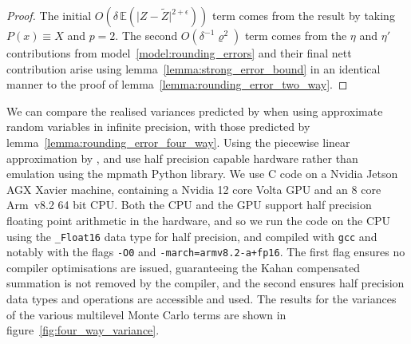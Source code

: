 \documentclass[manuscript,review]{acmart}
\begin{document}
\begin{proof}
The initial $ O(\delta\, \mathbb{E}(\lvert Z - \widetilde{Z} \rvert^{2 + \epsilon})) $ term comes from the result by \citet{giles2020approximate,giles2020approximating} taking $ P(x) \equiv X $ and $ p = 2 $. The second  $ O(\delta^{-1}\varrho^2)  $ term comes from the $ \eta $ and $ \eta' $ contributions from model~\ref{model:rounding_errors} and their final nett contribution arise using lemma~\ref{lemma:strong_error_bound} in an identical manner to the proof of lemma~\ref{lemma:rounding_error_two_way}. \qedhere
\end{proof}

We can compare the realised variances  predicted by  \citet{giles2020approximate,giles2020approximating} when using approximate random variables in infinite precision, with those predicted by lemma~\ref{lemma:rounding_error_four_way}. Using the piecewise linear approximation by \citet{giles2020approximating}, and use half precision capable hardware rather than emulation using the mpmath Python library. We use C code on a Nvidia Jetson AGX Xavier machine, containing a Nvidia 12 core Volta GPU and an 8 core Arm~v8.2 64 bit CPU. Both the CPU and the GPU support half precision floating point arithmetic in the hardware, and so we run the code on the CPU using the \texttt{\_Float16} data type for half precision, and compiled with \texttt{gcc} and notably with the flags \texttt{-O0} and \texttt{-march=armv8.2-a+fp16}. The first flag ensures no compiler optimisations are issued, guaranteeing the Kahan compensated summation is not removed by the compiler, and the second ensures half precision data types and operations are accessible and used. The results for the variances of the various multilevel Monte Carlo terms are shown in figure~\ref{fig:four_way_variance}.
\end{document}
